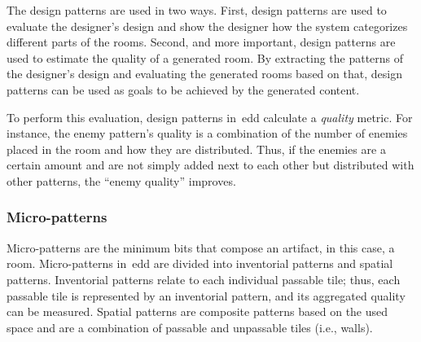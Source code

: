 
The design patterns are used in two ways. First, design patterns are used to evaluate the designer's design and show the designer how the system categorizes different parts of the rooms. Second, and more important, design patterns are used to estimate the quality of a generated room. By extracting the patterns of the designer's design and evaluating the generated rooms based on that, design patterns can be used as goals to be achieved by the generated content. 

To perform this evaluation, design patterns in~\acrshort{edd} calculate a \emph{quality} metric. For instance, the enemy pattern's quality is a combination of the number of enemies placed in the room and how they are distributed. Thus, if the enemies are a certain amount and are not simply added next to each other but distributed with other patterns, the ``enemy quality'' improves.






\subsubsection{Micro-patterns}

Micro-patterns are the minimum bits that compose an artifact, in this case, a room. Micro-patterns in~\acrshort{edd} are divided into inventorial patterns and spatial patterns. Inventorial patterns relate to each individual passable tile; thus, each passable tile is represented by an inventorial pattern, and its aggregated quality can be measured. Spatial patterns are composite patterns based on the used space and are a combination of passable and unpassable tiles (i.e., walls).


